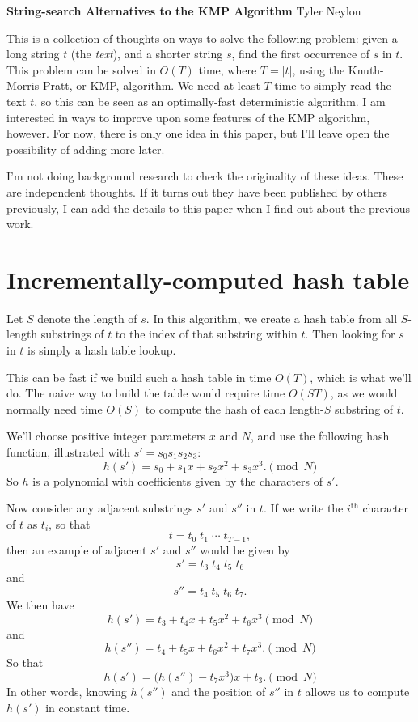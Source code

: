 \documentclass[11pt]{amsart}
\newcommand{\up}[1]{\ensuremath{^{\textrm{#1}}}}
\begin{document}
{\bf String-search Alternatives to the KMP Algorithm} \hfill Tyler Neylon

\medskip

This is a collection of thoughts on ways to solve the following problem:
given a long string $t$ (the {\em text}), and a shorter string $s$, find
the first occurrence of $s$ in $t$.
This problem can be solved in $O(T)$ time, where $T=|t|$, using the
Knuth-Morris-Pratt, or KMP, algorithm. We need at least $T$ time to
simply read the text $t$, so this can be seen as an optimally-fast
deterministic algorithm. I am interested in ways to improve upon
some features of the KMP algorithm, however. For now, there is
only one idea in this paper, but I'll leave open the possibility of
adding more later.

I'm not doing background research to check the originality of these
ideas. These are independent thoughts.
If it turns out they have
been published by others previously,
I can add the details to this paper when
I find out about the previous work.

\section{Incrementally-computed hash table}

Let $S$ denote the length of $s$.
In this algorithm, we create a hash table from all $S$-length
substrings of $t$ to the index of that substring within $t$.
Then looking for $s$ in $t$ is simply a hash table lookup.

This can be fast if we build such a hash table in time
$O(T)$, which is what we'll do. The naive way to build
the table would require time $O(ST)$, as we would normally
need time $O(S)$ to compute the hash of each length-$S$
substring of $t$.

We'll choose positive integer parameters $x$ and $N$, and
use the following hash function, illustrated with
$s' = s_0s_1s_2s_3$:
$$ h(s') = s_0 + s_1x + s_2x^2 + s_3x^3.\pmod{N}$$
So $h$ is a polynomial with coefficients given by the
characters of $s'$.

Now consider any adjacent substrings $s'$ and $s''$ in $t$.
If we write the $i\up{th}$ character of $t$ as $t_i$, so that
$$ t = t_0\;t_1\;\cdots\; t_{T-1}, $$
then an example of adjacent $s'$ and $s''$ would be given by
$$ s' = t_3\;t_4\;t_5\;t_6 $$
and
$$ s'' = t_4\;t_5\;t_6\;t_7.$$
We then have
$$ h(s') = t_3 + t_4x + t_5x^2 + t_6x^3 \pmod{N} $$
and
$$ h(s'') = t_4 + t_5x + t_6x^2 + t_7x^3.\pmod{N} $$
So that
$$ h(s') = \big(h(s'') - t_7x^3\big)x + t_3. \pmod{N} $$
In other words, knowing $h(s'')$ and the position of $s''$ in $t$
allows us to compute $h(s')$ in constant time.
\end{document}

